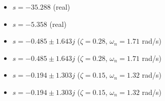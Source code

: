\begin{itemize}
    \item $s = -35.288$ (real)
    \item $s = -5.358$ (real)
    \item $s = -0.485 \pm 1.643j$ ($\zeta=0.28$, $\omega_n=1.71$ rad/s)
    \item $s = -0.485 \pm 1.643j$ ($\zeta=0.28$, $\omega_n=1.71$ rad/s)
    \item $s = -0.194 \pm 1.303j$ ($\zeta=0.15$, $\omega_n=1.32$ rad/s)
    \item $s = -0.194 \pm 1.303j$ ($\zeta=0.15$, $\omega_n=1.32$ rad/s)
\end{itemize}
